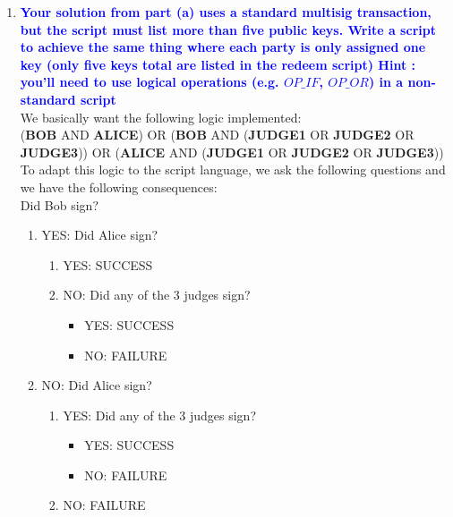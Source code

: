 \documentclass[11pt]{article}
\begin{document}
\begin{enumerate}
\begin{enumerate}
    \item \textbf{\textcolor{blue}{Your solution from part (a) uses a standard multisig transaction, but the script must list more than five public keys. Write a script to achieve the same thing where each party is only assigned one key (only five keys total are listed in the redeem script) Hint : you'll need to use logical operations (e.g. $OP\_IF$, $OP\_OR$) in a non-standard script}}
        \\ We basically want the following logic implemented: 
        \\ (\textbf{BOB} AND \textbf{ALICE}) OR (\textbf{BOB} AND (\textbf{JUDGE1} OR \textbf{JUDGE2} OR \textbf{JUDGE3})) OR (\textbf{ALICE} AND (\textbf{JUDGE1} OR \textbf{JUDGE2} OR \textbf{JUDGE3}))
        \\ To adapt this logic to the script language, we ask the following questions and we have the following consequences:
        \newline
        \\ Did Bob sign?
        \begin{enumerate}
            \item YES: Did Alice sign?
            \begin{enumerate}
                \item YES: SUCCESS
                \item NO: Did any of the 3 judges sign?
                \begin{itemize}
                    \item YES: SUCCESS
                    \item NO: FAILURE
                \end{itemize}
            \end{enumerate}
            \item NO: Did Alice sign?
            \begin{enumerate}
                \item YES: Did any of the 3 judges sign?
                \begin{itemize}
                    \item YES: SUCCESS
                    \item NO: FAILURE
                \end{itemize}
                \item NO: FAILURE
            \end{enumerate}
        \end{enumerate}
        \newline

\end{enumerate}
\end{enumerate}
\end{document}

